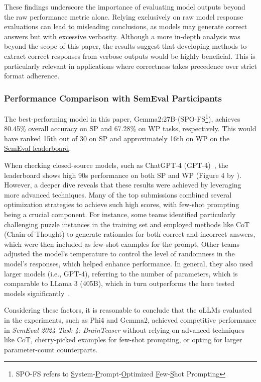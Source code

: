 These findings underscore the importance of evaluating model outputs beyond the raw performance metric alone. Relying exclusively on raw model response evaluations can lead to misleading conclusions, as models may generate correct answers but with excessive verbosity. Although a more in-depth analysis was beyond the scope of this paper, the results suggest that developing methods to extract correct responses from verbose outputs would be highly beneficial. This is particularly relevant in applications where correctness takes precedence over strict format adherence.

\subsubsection{Performance Comparison with SemEval Participants}

The best-performing model in this paper, Gemma2:27B-(SPO-FS\footnote{SPO-FS refers to \underline{S}ystem-\underline{P}rompt-\underline{O}ptimized \underline{F}ew-\underline{S}hot Prompting}), achieves 80.45\% overall accuracy on \acf{SP} and 67.28\% on \acf{WP} tasks, respectively. This would have ranked 15th out of 30 on \ac{SP} and approximately 16th on \ac{WP} on the \href{https://brainteasersem.github.io/\#leaderboard}{SemEval leaderboard}.

When checking closed-source models, such as ChatGPT-4 (GPT-4)~\cite{openaiGPT4TechnicalReport2024}, the leaderboard shows high 90s performance on both \ac{SP} and \ac{WP} (Figure 4 by \textcite{jiangSemEval2024Task92024}). However, a deeper dive reveals that these results were achieved by leveraging more advanced techniques. Many of the top submissions combined several optimization strategies to achieve such high scores, with few-shot prompting being a crucial component. For instance, some teams identified particularly challenging puzzle instances in the training set and employed methods like \ac{CoT} (Chain-of-Thought) to generate rationales for both correct and incorrect answers, which were then included as few-shot examples for the prompt. Other teams adjusted the model's temperature to control the level of randomness in the model's responses, which helped enhance performance. In general, they also used larger models (i.e., GPT-4), referring to the number of parameters, which is comparable to LLama 3 (405B), which in turn outperforms the here tested models significantly~\cite{grattafioriLlama3Herd2024, openaiGPT4TechnicalReport2024}.

Considering these factors, it is reasonable to conclude that the \acp{oLLM} evaluated in the experiments, such as Phi4 and Gemma2, achieved competitive performance in \textit{SemEval 2024 Task 4: BrainTeaser} without relying on advanced techniques like \ac{CoT}, cherry-picked examples for few-shot prompting, or opting for larger parameter-count counterparts.


